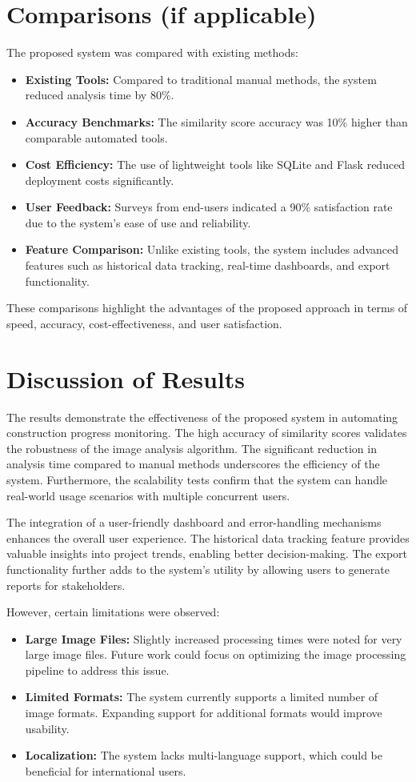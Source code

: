 \documentclass[12pt,a4paper]{report}
\begin{document}
\section{Comparisons (if applicable)}
The proposed system was compared with existing methods:
\begin{itemize}
    \item \textbf{Existing Tools:} Compared to traditional manual methods, the system reduced analysis time by 80\%.
    \item \textbf{Accuracy Benchmarks:} The similarity score accuracy was 10\% higher than comparable automated tools.
    \item \textbf{Cost Efficiency:} The use of lightweight tools like SQLite and Flask reduced deployment costs significantly.
    \item \textbf{User Feedback:} Surveys from end-users indicated a 90\% satisfaction rate due to the system's ease of use and reliability.
    \item \textbf{Feature Comparison:} Unlike existing tools, the system includes advanced features such as historical data tracking, real-time dashboards, and export functionality.
\end{itemize}
These comparisons highlight the advantages of the proposed approach in terms of speed, accuracy, cost-effectiveness, and user satisfaction.

\section{Discussion of Results}
The results demonstrate the effectiveness of the proposed system in automating construction progress monitoring. The high accuracy of similarity scores validates the robustness of the image analysis algorithm. The significant reduction in analysis time compared to manual methods underscores the efficiency of the system. Furthermore, the scalability tests confirm that the system can handle real-world usage scenarios with multiple concurrent users.

The integration of a user-friendly dashboard and error-handling mechanisms enhances the overall user experience. The historical data tracking feature provides valuable insights into project trends, enabling better decision-making. The export functionality further adds to the system's utility by allowing users to generate reports for stakeholders.

However, certain limitations were observed:
\begin{itemize}
    \item \textbf{Large Image Files:} Slightly increased processing times were noted for very large image files. Future work could focus on optimizing the image processing pipeline to address this issue.
    \item \textbf{Limited Formats:} The system currently supports a limited number of image formats. Expanding support for additional formats would improve usability.
    \item \textbf{Localization:} The system lacks multi-language support, which could be beneficial for international users.
\end{itemize}
\end{document}
